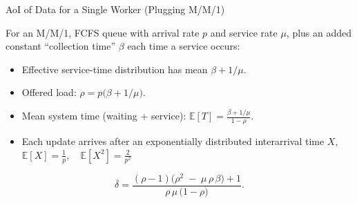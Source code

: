 \documentclass[aspectratio=169,xcolor=dvipsnames]{beamer}
\begin{document}
\begin{frame}[fragile]{AoI of Data for a Single Worker (Plugging M/M/1)}
    \footnotesize %
    
    For an M/M/1, FCFS queue with arrival rate $p$ and service rate $\mu$, plus an added 
    constant “collection time” $\beta$ each time a service occurs:
    \begin{itemize}
      \item Effective service-time distribution has mean \(\beta + 1/\mu\).
      \item Offered load: \(\rho = p\bigl(\beta + 1/\mu\bigr)\).
      \item Mean system time (waiting + service): \(
\mathbb{E}[T] = \frac{\beta + 1/\mu}{1 - \rho}\).
    \item Each update arrives after an exponentially distributed interarrival time \(X\), 
\(\mathbb{E}[X] = \frac{1}{p}, \quad \mathbb{E}[X^2] = \frac{2}{p^2}\)
\end{itemize}
   \hspace*{1cm} 
    \[
    \overline{\delta}
    = \frac{(\rho - 1)\bigl(\rho^2 \;-\;\mu\,\rho\,\beta\bigr) + 1}
           {\rho \,\mu \,\bigl(1 - \rho\bigr)}.
    \]
      
\end{frame}

\end{document}
